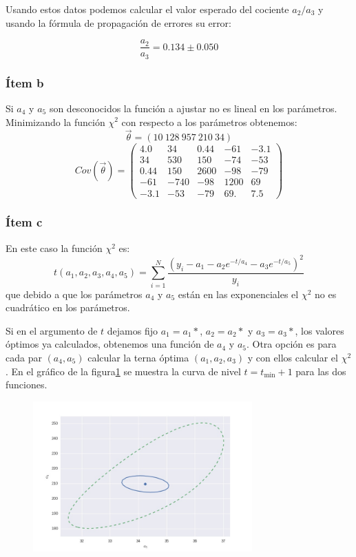 Usando estos datos podemos calcular el valor esperado del cociente $a_2/a_3$ y usando la fórmula de propagación de errores su error:

$$
\frac{a_2}{a_3} = 0.134 \pm 0.050
$$

\subsubsection*{Ítem b}
Si $a_4$ y $a_5$ son desconocidos la función a ajustar no es lineal en los parámetros.
Minimizando la función $\chi^2$ con respecto a los parámetros obtenemos:
$$
\vec{\theta}=(10\ 128\ 957\  210\  34)
$$
$$
Cov(\vec{\theta}) = \left(
\begin{matrix}
4.0  & 34   &  0.44 & -61  & -3.1\\
34   & 530  & 150   & -74  & -53\\
0.44 & 150  & 2600  & -98  & -79\\
-61  & -740 & -98   & 1200 & 69\\
-3.1 & -53  & -79   & 69.  & 7.5
\end{matrix}
\right)
$$
\subsubsection*{Ítem c}
En este caso la función $\chi^2$ es:
$$
t(a_1, a_2, a_3, a_4, a_5) = \sum_{i=1}^N \frac{{\left(y_i-a_1 - a_2 e^{-t/a_4} - a_3 e^{-t/a_5}\right)}^2}{y_i}
$$
que debido a que los parámetros $a_4$ y $a_5$ están en las exponenciales el $\chi^2$ no es cuadrático en los parámetros.

Si en el argumento de $t$ dejamos fijo $a_1=a_1*$, $a_2=a_2*$ y $a_3=a_3*$, los valores óptimos ya calculados, obtenemos una función de $a_4$ y $a_5$.
Otra opción es para cada par $(a_4, a_5)$ calcular la terna óptima $(a_1, a_2, a_3)$ y con ellos calcular el $\chi^2$.
En el gráfico de la figura\ref{fig:fig1} se muestra la curva de nivel $t=t_{\min} + 1$ para las dos funciones.

\begin{figure}
\centering
\includegraphics[width=0.75\textwidth]{fig1.jpg}
\caption[]{}
\label{fig:fig1}
\end{figure}


